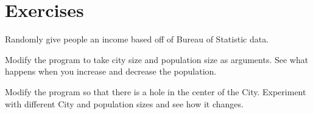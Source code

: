 \section{Exercises}

\begin{excercise}
Randomly give people an income based off of Bureau of Statistic data.
\end{excercise}

\begin{excercise}
Modify the program to take city size and population size as arguments. See what happens when you increase and decrease the population.
\end{excercise}

\begin{excercise}
Modify the program so that there is a hole in the center of the City. Experiment with different City and population sizes and see how it changes.
\end{excercise}